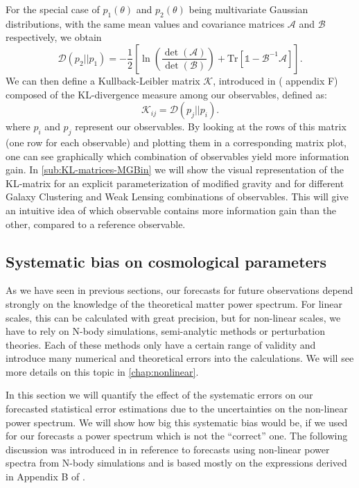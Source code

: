 For the special case of $p_1(\theta)$ and $p_2(\theta)$ being multivariate Gaussian distributions,
with the same mean values and covariance matrices $\mathcal{A}$ and $\mathcal{B}$ respectively, we obtain
\begin{equation}\label{eq:KL-Gaussian}
\mathcal{D}(p_2||p_1) = -\frac{1}{2} \left[\ln\left(\frac{\det(\mathcal{A})}{\det(\mathcal{B})} \right) +\mathrm{Tr}\left[\mathbb{1}-\mathcal{B}^{-1}\mathcal{A}   \right] \right].
\end{equation}
We can then define a Kullback-Leibler matrix $\mathcal{K}$, introduced in (\cite{casas_mg_forec} appendix F) composed of the KL-divergence measure among our observables, defined as:
\begin{equation}\label{eq:KL-Matrix}
\mathcal{K}_{ij}=\mathcal{D}(p_j||p_i).
\end{equation}
where $p_i$ and $p_j$ represent our observables.
By looking at the rows of this matrix (one row for each observable) and plotting them
in a corresponding matrix plot, one can see graphically which combination
of observables yield more information gain.
In \cref{sub:KL-matrices-MGBin} we will show the visual representation
of the KL-matrix for an explicit parameterization of modified gravity
and for different Galaxy Clustering and Weak Lensing combinations of observables.
This will give an intuitive idea of which observable contains more information gain than the other, 
compared to a reference observable.

\subsection{Systematic bias on cosmological parameters \label{sub:syst-bias-theory}}

As we have seen in previous sections, our forecasts for future observations
depend strongly on the knowledge of the theoretical matter power spectrum.
For linear scales, this can be calculated with great precision, but for non-linear scales, 
we have to rely on N-body simulations, semi-analytic methods or perturbation theories. Each 
of these methods only have a certain range of validity and introduce many numerical and theoretical 
errors into the calculations. We will see more details on this topic in \cref{chap:nonlinear}.

In this section we will quantify the effect of the systematic errors on our forecasted statistical error estimations
due to the uncertainties on the non-linear power spectrum. We will
show how big this systematic bias would be, if we used for our forecasts
a power spectrum which is not the ``correct'' one. 
The following discussion was introduced in \cite{casas_fitting_2015} in reference to
forecasts using non-linear power spectra from N-body simulations and is based mostly on 
the expressions derived in Appendix
B of \cite{taylor_probing_2007}.

